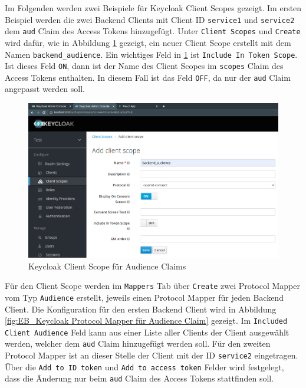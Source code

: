 Im Folgenden werden zwei Beispiele für Keycloak Client Scopes gezeigt. Im ersten Beispiel werden die zwei Backend Clients mit Client ID \texttt{service1} und \texttt{service2} dem \texttt{aud} Claim des Access Tokens hinzugefügt. Unter \texttt{Client Scopes} und \texttt{Create} wird dafür, wie in Abbildung \ref{fig:EB_Keycloak Client Scope für Audience Claim} gezeigt, ein neuer Client Scope erstellt mit dem Namen \texttt{backend\_audience}. Ein wichtiges Feld in \ref{fig:EB_Keycloak Client Scope für Audience Claim} ist \texttt{Include In Token Scope}. Ist dieses Feld \texttt{ON}, dann ist der Name des Client Scopes im \texttt{scopes} Claim des Access Tokens enthalten. In diesem Fall ist das Feld \texttt{OFF}, da nur der \texttt{aud} Claim angepasst werden soll.

\begin{figure}[!ht]
	\centering
	\includegraphics[width=1\textwidth]{Images/EbertScherer/KeycloakNewAudClientScope.PNG}
	\caption{Keycloak Client Scope für Audience Claims}
	\label{fig:EB_Keycloak Client Scope für Audience Claim}
\end{figure}

Für den Client Scope werden im \texttt{Mappers} Tab über \texttt{Create} zwei Protocol Mapper vom Typ \texttt{Audience} erstellt, jeweils einen Protocol Mapper für jeden Backend Client. Die Konfiguration für den ersten Backend Client wird in Abbildung \ref{fig:EB_Keycloak Protocol Mapper für Audience Claim} gezeigt. Im \texttt{Included Client Audience} Feld kann aus einer Liste aller Clients der Client ausgewählt werden, welcher dem \texttt{aud} Claim hinzugefügt werden soll. Für den zweiten Protocol Mapper ist an dieser Stelle der Client mit der ID \texttt{service2} eingetragen. Über die \texttt{Add to ID token} und \texttt{Add to access token} Felder wird festgelegt, dass die Änderung nur beim \texttt{aud} Claim des Access Tokens stattfinden soll.

